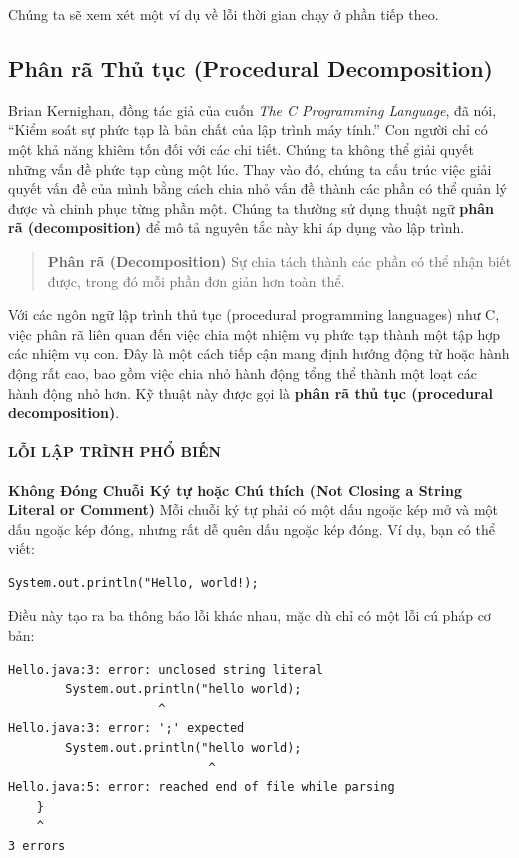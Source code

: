 Chúng ta sẽ xem xét một ví dụ về lỗi thời gian chạy ở phần tiếp theo.

\subsection{Phân rã Thủ tục (Procedural
Decomposition)}\label{phuxe2n-ruxe3-thux1ee7-tux1ee5c-procedural-decomposition}

Brian Kernighan, đồng tác giả của cuốn \emph{The C Programming
Language}, đã nói, ``Kiểm soát sự phức tạp là bản chất của lập trình máy
tính.'' Con người chỉ có một khả năng khiêm tốn đối với các chi tiết.
Chúng ta không thể giải quyết những vấn đề phức tạp cùng một lúc. Thay
vào đó, chúng ta cấu trúc việc giải quyết vấn đề của mình bằng cách chia
nhỏ vấn đề thành các phần có thể quản lý được và chinh phục từng phần
một. Chúng ta thường sử dụng thuật ngữ \textbf{phân rã (decomposition)}
để mô tả nguyên tắc này khi áp dụng vào lập trình.

\begin{quote}
\textbf{Phân rã (Decomposition)} Sự chia tách thành các phần có thể nhận
biết được, trong đó mỗi phần đơn giản hơn toàn thể.
\end{quote}

Với các ngôn ngữ lập trình thủ tục (procedural programming languages)
như C, việc phân rã liên quan đến việc chia một nhiệm vụ phức tạp thành
một tập hợp các nhiệm vụ con. Đây là một cách tiếp cận mang định hướng
động từ hoặc hành động rất cao, bao gồm việc chia nhỏ hành động tổng thể
thành một loạt các hành động nhỏ hơn. Kỹ thuật này được gọi là
\textbf{phân rã thủ tục (procedural decomposition)}.

\paragraph{LỖI LẬP TRÌNH PHỔ
BIẾN}\label{lux1ed7i-lux1eadp-truxecnh-phux1ed5-biux1ebfn-4}

\textbf{Không Đóng Chuỗi Ký tự hoặc Chú thích (Not Closing a String
Literal or Comment)} Mỗi chuỗi ký tự phải có một dấu ngoặc kép mở và một
dấu ngoặc kép đóng, nhưng rất dễ quên dấu ngoặc kép đóng. Ví dụ, bạn có
thể viết:

\begin{verbatim}
System.out.println("Hello, world!);
\end{verbatim}

Điều này tạo ra ba thông báo lỗi khác nhau, mặc dù chỉ có một lỗi cú
pháp cơ bản:

\begin{verbatim}
Hello.java:3: error: unclosed string literal
        System.out.println("hello world);
                     ^
Hello.java:3: error: ';' expected
        System.out.println("hello world);
                            ^
Hello.java:5: error: reached end of file while parsing
    }
    ^
3 errors
\end{verbatim}

